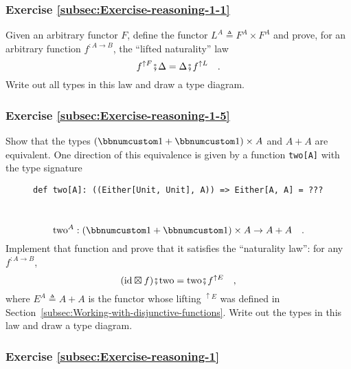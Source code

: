 \subsubsection{Exercise \label{subsec:Exercise-reasoning-1-1}\ref{subsec:Exercise-reasoning-1-1}}

Given an arbitrary functor $F$, define the functor $L^{A}\triangleq F^{A}\times F^{A}$
and prove, for an arbitrary function $f^{:A\rightarrow B}$, the \textsf{``}lifted
naturality\textsf{''} law
\[
f^{\uparrow F}\bef\Delta=\Delta\bef f^{\uparrow L}\quad.
\]
Write out all types in this law and draw a type diagram.

\subsubsection{Exercise \label{subsec:Exercise-reasoning-1-5}\ref{subsec:Exercise-reasoning-1-5}}

Show that the types $(\bbnum 1+\bbnum 1)\times A$ and $A+A$ are
equivalent. One direction of this equivalence is given by a function
\lstinline!two[A]! with the type signature

\begin{wrapfigure}{L}{0.63\columnwidth}%
\vspace{-0.65\baselineskip}
\begin{lstlisting}
def two[A]: ((Either[Unit, Unit], A)) => Either[A, A] = ???
\end{lstlisting}

\vspace{-0.25\baselineskip}
\end{wrapfigure}%

~\vspace{-1.15\baselineskip}
\[
\text{two}^{A}:(\bbnum 1+\bbnum 1)\times A\rightarrow A+A\quad.
\]
\vspace{-0.35\baselineskip}
Implement that function and prove that it satisfies the \textsf{``}naturality
law\textsf{''}: for any $f^{:A\rightarrow B}$,
\[
(\text{id}\boxtimes f)\bef\text{two}=\text{two}\bef f^{\uparrow E}\quad,
\]
where $E^{A}\triangleq A+A$ is the functor whose lifting $^{\uparrow E}$
was defined in Section~\ref{subsec:Working-with-disjunctive-functions}.
Write out the types in this law and draw a type diagram. 

\subsubsection{Exercise \label{subsec:Exercise-reasoning-1}\ref{subsec:Exercise-reasoning-1}}

